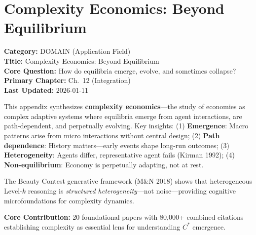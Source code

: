 \section{Complexity Economics: Beyond Equilibrium}
\label{app:complexity-economics}


\begin{tcolorbox}[colback=gray!5!white, colframe=gray!75!black,
    title=\textbf{Appendix: AG DOMAIN-COMPLEXITY}]
\textbf{Category:} DOMAIN (Application Field) \\
\textbf{Title:} Complexity Economics: Beyond Equilibrium \\
\textbf{Core Question:} How do equilibria emerge, evolve, and sometimes collapse? \\
\textbf{Primary Chapter:} Ch.\ 12 (Integration) \\
\textbf{Last Updated:} 2026-01-11
\end{tcolorbox}

\begin{tcolorbox}[colback=blue!5!white, colframe=blue!75!black,
    title=\textbf{Abstract}]

This appendix synthesizes \textbf{complexity economics}---the study of economies
as complex adaptive systems where equilibria emerge from agent interactions,
are path-dependent, and perpetually evolving. Key insights:
(1) \textbf{Emergence}: Macro patterns arise from micro interactions without central design;
(2) \textbf{Path dependence}: History matters---early events shape long-run outcomes;
(3) \textbf{Heterogeneity}: Agents differ, representative agent fails (Kirman 1992);
(4) \textbf{Non-equilibrium}: Economy is perpetually adapting, not at rest.

The Beauty Contest generative framework (M\&N 2018) shows that heterogeneous
Level-$k$ reasoning is \textit{structured heterogeneity}---not noise---providing
cognitive microfoundations for complexity dynamics.

\textbf{Core Contribution:} 20 foundational papers with 80,000+ combined citations
establishing complexity as essential lens for understanding $C^*$ emergence.

\end{tcolorbox}

